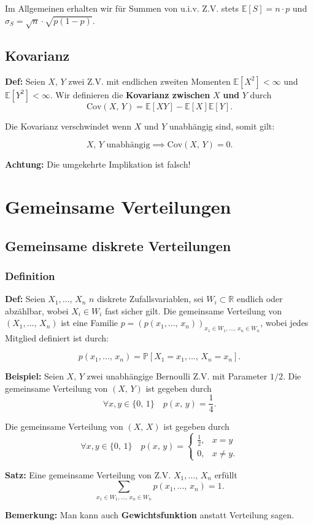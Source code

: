 \documentclass[a4paper]{extarticle}
\begin{document}
Im Allgemeinen erhalten wir für Summen von u.i.v. Z.V. stets $\mathbb{E}[S] = n \cdot p$ und $\sigma_S = \sqrt{n} \cdot \sqrt{p(1-p)}$.

\subsection{Kovarianz}

\textbf{Def:} Seien $X, \, Y$ zwei Z.V. mit endlichen zweiten Momenten $\mathbb{E}[X^2] < \infty$ und $\mathbb{E}[Y^2] < \infty$. Wir definieren die \textbf{Kovarianz zwischen} $X$ \textbf{und} $Y$ durch
\[
    \text{Cov}(X, \, Y) = \mathbb{E}[XY] - \mathbb{E}[X]\mathbb{E}[Y].
\]

Die Kovarianz verschwindet wenn $X$ und $Y$ unabhängig sind, somit gilt:

\[
    X, \, Y \text{ unabhängig} \implies \text{Cov}(X, \, Y) = 0.
\]

\textbf{Achtung:} Die umgekehrte Implikation ist falsch!

\section{Gemeinsame Verteilungen}

\subsection{Gemeinsame diskrete Verteilungen}

\subsubsection{Definition}

\textbf{Def:} Seien $X_1,..., \, X_n$ $n$ diskrete Zufallsvariablen, sei $W_i \subset \mathbb{R}$ endlich oder abzählbar, wobei $X_i \in W_i$ fast sicher gilt. Die gemeinsame Verteilung von $(X_1,..., \, X_n)$ ist eine Familie $p = (p(x_1,..., \, x_n))_{x_1 \in W_1,..., \, x_n \in W_n}$, wobei jedes Mitglied definiert ist durch:

\[
    p(x_1,..., \, x_n) = \mathbb{P}[X_1 = x_1,..., \, X_n = x_n].
\]

\begin{ebox}
    \textbf{Beispiel:} Seien $X, \, Y$ zwei unabhängige Bernoulli Z.V. mit Parameter $1/2$. Die gemeinsame Verteilung von $(X, \, Y)$ ist gegeben durch
    \[\forall x, y \in \{0, \, 1\} \quad p(x,\,y) = \frac{1}{4}.\]

    Die gemeinsame Verteilung von $(X, \, X)$ ist gegeben durch
    \[\forall x,y \in \{0, \, 1\} \quad p(x, \, y) = \begin{cases}
        \frac{1}{2}, &x = y\\ 0, &x \neq y.
    \end{cases}\]
\end{ebox}

\begin{cbox}
    \textbf{Satz:} Eine gemeinsame Verteilung von Z.V. $X_1,..., \, X_n$ erfüllt
    \[
        \sum_{x_1 \in W_1,..., \, x_n \in W_n} p(x_1,..., \, x_n) = 1.
    \]
\end{cbox}

\textbf{Bemerkung:} Man kann auch \textbf{Gewichtsfunktion} anstatt Verteilung sagen.
\end{document}
